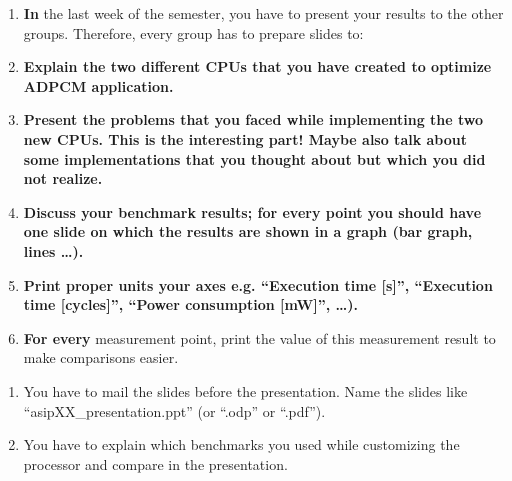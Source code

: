 \documentclass[
]{article}
\begin{document}
\begin{enumerate}
  \begin{enumerate}
  \def\labelenumii{\arabic{enumii}.}
  \item
    \textbf{In} the last week of the semester, you have to present your
    results to the other groups. Therefore, every group has to prepare
    slides to:
  \item
    \textbf{Explain the two different CPUs that you have created to
    optimize ADPCM application.}
  \item
    \textbf{Present the problems that you faced while implementing the
    two new CPUs. This is the interesting part! Maybe also talk about
    some implementations that you thought about but which you did not
    realize.}
  \item
    \textbf{Discuss your benchmark results; for every point you should
    have one slide on which the results are shown in a graph (bar graph,
    lines \ldots).}
  \item
    \textbf{Print proper units your axes e.g. ``Execution time
    {[}s{]}'', ``Execution time {[}cycles{]}'', ``Power consumption
    {[}mW{]}'', \ldots).}
  \item
    \textbf{For every} measurement point, print the value of this
    measurement result to make comparisons easier.
  \end{enumerate}
\end{enumerate}

\begin{enumerate}
\def\labelenumi{\alph{enumi})}
\item
  You have to mail the slides before the presentation. Name the slides
  like ``asipXX\_presentation.ppt'' (or ``.odp'' or ``.pdf'').
\item
  You have to explain which benchmarks you used while customizing the
  processor and compare in the presentation.
\end{enumerate}
\end{document}
